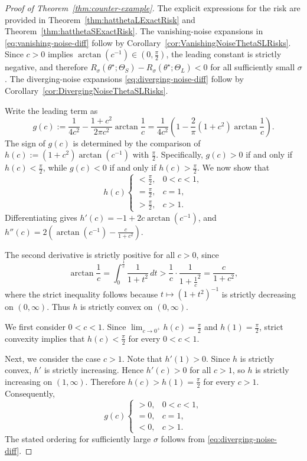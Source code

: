 \documentclass[11pt]{article}
\theoremstyle{plain}
\theoremstyle{definition}
\begin{document}
\begin{proof}[Proof of Theorem~\ref{thm:counter-example}]
The explicit expressions for the risk are provided in Theorem~\ref{thm:hatthetaLExactRisk} and Theorem~\ref{thm:hatthetaSExactRisk}. The vanishing-noise expansions in \eqref{eq:vanishing-noise-diff} follow by Corollary~\ref{cor:VanishingNoiseThetaSLRisks}. Since $c>0$ implies $\arctan (c^{-1}) \in(0,\frac\pi2)$, the leading constant is strictly negative, and therefore
$R_\sigma(\theta^\star; \Theta_S)-R_\sigma(\theta^\star; \Theta_L)<0$ for all sufficiently small $\sigma$.
The diverging-noise expansions \eqref{eq:diverging-noise-diff} follow by Corollary~\ref{cor:DivergingNoiseThetaSLRisks}. 

Write the leading term as
\[
g(c)
:=
\frac{1}{4c^2}-\frac{1+c^2}{2\pi c^2}\arctan \frac{1}{c}
=
\frac{1}{4c^2}\left(1-\frac{2}{\pi}(1+c^2)\arctan \frac{1}{c}\right).
\]
The sign of $g(c)$ is determined by the comparison of $h(c):=(1+c^2)\arctan(c^{-1})$ with $\frac{\pi}{2}$. Specifically, $g(c)>0$ if and only if
$h(c)<\frac{\pi}{2}$, while $g(c)<0$ if and only if $h(c)>\frac{\pi}{2}$. We now show that
\[
h(c)
\begin{cases}
<\frac{\pi}{2}, & 0<c<1,\\[2pt]
=\frac{\pi}{2}, & c=1,\\[2pt]
>\frac{\pi}{2}, & c>1.
\end{cases}
\]
Differentiating gives $h'(c)=-1+2c\arctan (c^{-1})$, and $ h''(c)
    = 2(\arctan (c^{-1})-\frac{c}{1+c^2})$.

The second derivative is strictly positive for all $c>0$, since
\[
    \arctan \frac{1}{c} 
    =
    \int_0^{\frac{1}{c}} \frac{1}{1+t^2}\,dt
    >
    \frac{1}{c}\cdot \frac{1}{1+\frac{1}{c}^2}
    =
    \frac{c}{1+c^2},
\]
where the strict inequality follows because $t\mapsto (1+t^2)^{-1}$ is strictly decreasing on $(0,\infty)$. 
Thus $h$ is strictly convex on $(0,\infty)$. 

We first consider $0<c<1$. Since $\lim_{c\to 0^+} h(c)=\frac{\pi}{2}$ and $h(1)=\frac{\pi}{2}$, strict convexity implies that $h(c)<\frac{\pi}{2}$ for every $0<c<1$.

Next, we consider the case $c>1$. Note that $h'(1)>0$. Since $h$ is strictly convex, $h'$ is strictly increasing. Hence
$h'(c)>0$ for all $c>1$, so $h$ is strictly increasing on
$(1,\infty)$. Therefore $h(c)>h(1)=\frac{\pi}{2}$ for every $c>1$. Consequently,
\[
g(c)
\begin{cases}
>0, & 0<c<1,\\
=0, & c=1,\\
<0, & c>1.
\end{cases}
\]
The stated ordering for sufficiently large $\sigma$ follows from
\eqref{eq:diverging-noise-diff}.
\end{proof}
\end{document}
